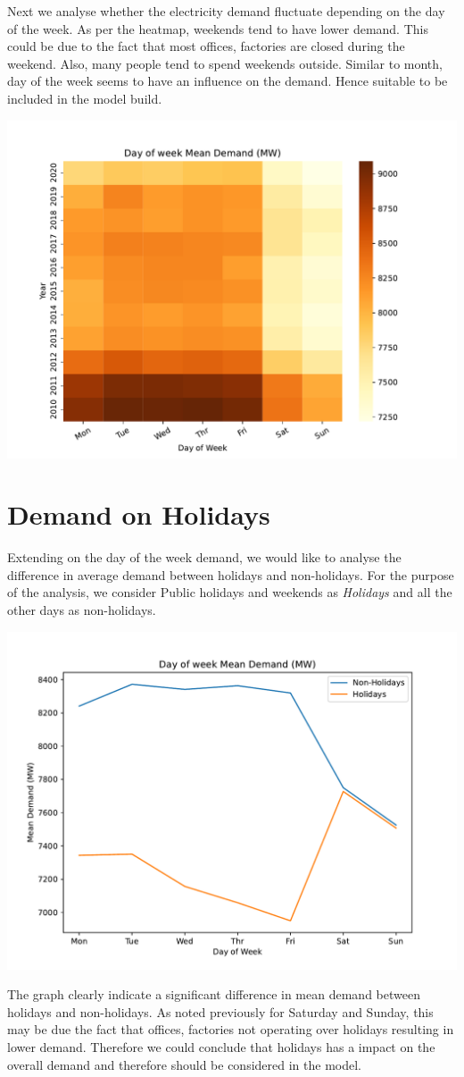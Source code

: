 \documentclass[mstat,12pt]{unswthesis}
\begin{document}
Next we analyse whether the electricity demand fluctuate depending on
the day of the week. As per the heatmap, weekends tend to have lower
demand. This could be due to the fact that most offices, factories are
closed during the weekend. Also, many people tend to spend weekends
outside. Similar to month, day of the week seems to have an influence on
the demand. Hence suitable to be included in the model build.

\begin{center}\includegraphics[width=0.5\linewidth]{unsw-ZZSC9020-report-template_files/figure-latex/unnamed-chunk-6-7} \end{center}

\section{Demand on Holidays}\label{demand-on-holidays}

Extending on the day of the week demand, we would like to analyse the
difference in average demand between holidays and non-holidays. For the
purpose of the analysis, we consider Public holidays and weekends as
\textit{Holidays} and all the other days as non-holidays.

\begin{center}\includegraphics[width=0.5\linewidth]{unsw-ZZSC9020-report-template_files/figure-latex/unnamed-chunk-7-9} \end{center}

The graph clearly indicate a significant difference in mean demand
between holidays and non-holidays. As noted previously for Saturday and
Sunday, this may be due the fact that offices, factories not operating
over holidays resulting in lower demand. Therefore we could conclude
that holidays has a impact on the overall demand and therefore should be
considered in the model.
\end{document}
